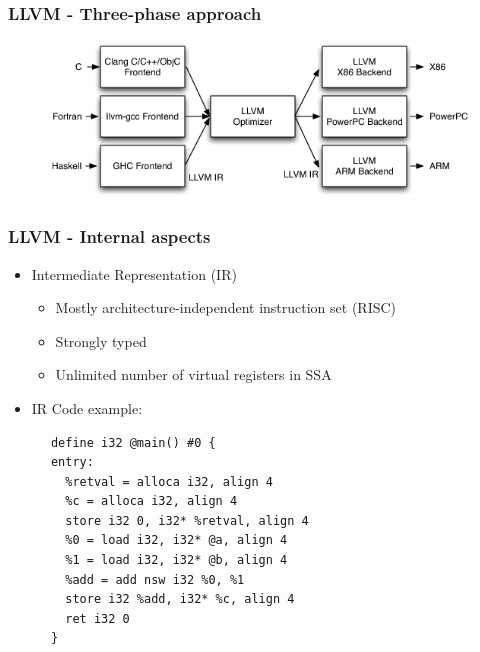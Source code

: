 \documentclass{smilebeamer}
\begin{document}
\begin{frame}
\frametitle{LLVM - Three-phase approach}
\begin{figure}
\includegraphics[width=1\linewidth]{img/llvm_struct.png}
\end{figure}
\end{frame}

\begin{frame}[fragile]
\frametitle{LLVM - Internal aspects}
\begin{itemize}
  \item Intermediate Representation (IR)
  \begin{itemize}
    \item Mostly architecture-independent instruction set (RISC)
    \item Strongly typed
    \item Unlimited number of virtual registers in SSA
  \end{itemize}
  \item IR Code example:
\end{itemize}

\begin{lstlisting}
      define i32 @main() #0 {
      entry:
        %retval = alloca i32, align 4
        %c = alloca i32, align 4
        store i32 0, i32* %retval, align 4
        %0 = load i32, i32* @a, align 4
        %1 = load i32, i32* @b, align 4
        %add = add nsw i32 %0, %1
        store i32 %add, i32* %c, align 4
        ret i32 0
      }
\end{lstlisting}
\end{frame}
\end{document}
